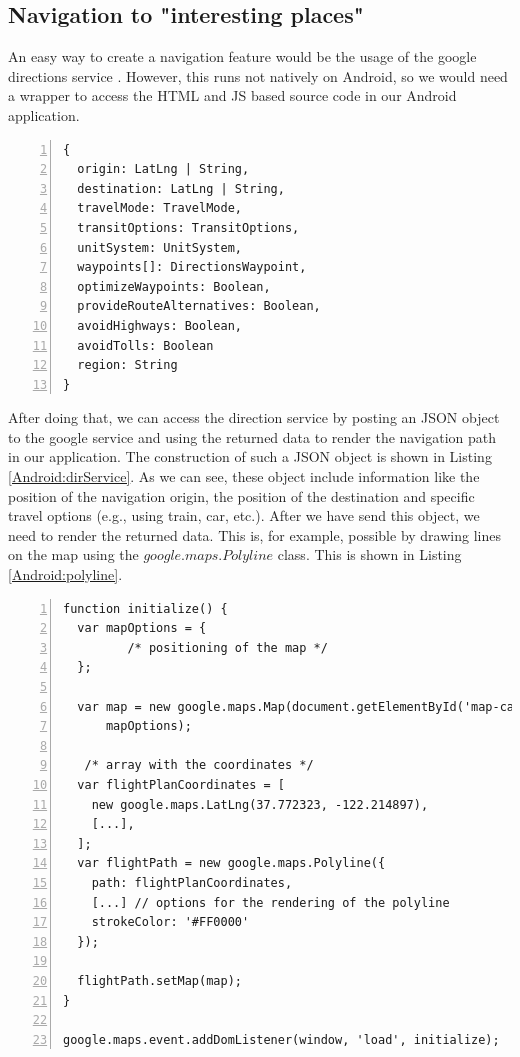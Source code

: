 \subsection{Navigation to "interesting places"}
An easy way to create a navigation feature would be the usage of the google directions service \cite{GoogleNavi}. However, this runs not natively on Android, so we would need a wrapper to access the \ac{HTML} and \ac{JS} based source code in our Android application. 

\begin{lstlisting}[numbers=left,caption={Example for construction of the DirectionsRequest JSON object that is needed to use the directions service},label=Android:dirService,frame=tlbr,breaklines]
{
  origin: LatLng | String,
  destination: LatLng | String,
  travelMode: TravelMode,
  transitOptions: TransitOptions,
  unitSystem: UnitSystem,
  waypoints[]: DirectionsWaypoint,
  optimizeWaypoints: Boolean,
  provideRouteAlternatives: Boolean,
  avoidHighways: Boolean,
  avoidTolls: Boolean
  region: String
}
\end{lstlisting}

After doing that, we can access the direction service by posting an \ac{JSON} object to the google service and using the returned data to render the navigation path in our application. The construction of such a \ac{JSON} object is shown in Listing \ref{Android:dirService}. As we can see, these object include information like the position of the navigation origin, the position of the destination and specific travel options (e.g., using train, car, etc.). After we have send this object, we need to render the returned data. This is, for example, possible by drawing lines on the map using the $google.maps.Polyline$ class. This is shown in Listing \ref{Android:polyline}.

\begin{lstlisting}[numbers=left,caption={Example for writing a poly line on the google map},label=Android:polyline,frame=tlbr,breaklines]
function initialize() {
  var mapOptions = {
         /* positioning of the map */
  };

  var map = new google.maps.Map(document.getElementById('map-canvas'),
      mapOptions);

   /* array with the coordinates */
  var flightPlanCoordinates = [
    new google.maps.LatLng(37.772323, -122.214897),
    [...],
  ];
  var flightPath = new google.maps.Polyline({
    path: flightPlanCoordinates,
    [...] // options for the rendering of the polyline
    strokeColor: '#FF0000'
  });

  flightPath.setMap(map);
}

google.maps.event.addDomListener(window, 'load', initialize);
\end{lstlisting}

